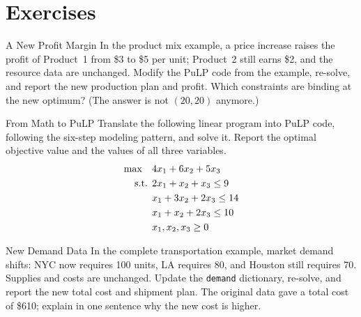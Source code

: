 \section{Exercises}


\begin{ex}{A New Profit Margin}{}
\label{ex:pulp-new-profit}
In the product mix example, a price increase raises the profit of Product~1 from \$3 to \$5 per unit; Product~2 still earns \$2, and the resource data are unchanged. Modify the PuLP code from the example, re-solve, and report the new production plan and profit. Which constraints are binding at the new optimum? (The answer is not $(20, 20)$ anymore.)
\end{ex}

\begin{ex}{From Math to PuLP}{}
\label{ex:pulp-translate}
Translate the following linear program into PuLP code, following the six-step modeling pattern, and solve it. Report the optimal objective value and the values of all three variables.
\begin{align*}
\max \quad & 4x_1 + 6x_2 + 5x_3 \\
\mbox{ s.t. }        & 2x_1 + x_2 + x_3 \leq 9 \\
& x_1 + 3x_2 + 2x_3 \leq 14 \\
& x_1 + x_2 + 2x_3 \leq 10 \\
& x_1, x_2, x_3 \geq 0
\end{align*}
\end{ex}

\begin{ex}{New Demand Data}{}
\label{ex:pulp-transport-data}
In the complete transportation example, market demand shifts: NYC now requires 100 units, LA requires 80, and Houston still requires 70. Supplies and costs are unchanged. Update the \texttt{demand} dictionary, re-solve, and report the new total cost and shipment plan. The original data gave a total cost of \$610; explain in one sentence why the new cost is higher.
\end{ex}


